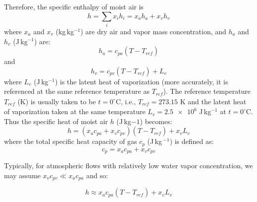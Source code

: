 Therefore, the specific enthalpy of moist air is 
\begin{equation}
h = \sum_i x_i h_i = x_a h_a + x_v h_v
\end{equation}
where $x_a$ and $x_v$ (kg\,kg$^{-1}$) are dry air and vapor mass concentration, and $h_a$ and $h_v$ (J\,kg$^{-1}$) are:
\begin{equation}
h_a = c_{pa} \left(T - T_{\textit{ref}}\right)
\end{equation}
and 
\begin{equation}
h_v = c_{pv} \left(  T - T_{\textit{ref}}\right) + L_v
\end{equation}
where $L_v$ (J\,kg$^{-1}$) is the latent heat of vaporization (more accurately, it is referenced at the same reference temperature as $T_{\textit{ref}}$). The reference temperature $T_{\textit{ref}}$ (K) is usually taken to be $t=0^{\circ}$C, i.e., $T_{\textit{ref}} = 273.15$ K and the latent heat of vaporization taken at the same temperature $L_v = \num{2.5e6}$ J\,kg$^{-1}$ at $t=0^{\circ}$C. Thus the specific heat of moist air $h$ (J\,kg${-1}$) becomes:
\begin{equation}
h = \left(x_a c_{pa} + x_v c_{pv} \right) \left(T - T_{\textit{ref}}\right)  + x_v L_v
\label{eq:enthalpymoistair}
\end{equation}
where the total specific heat capacity of gas $c_p$ (J\,kg\,$^{-1}$) is defined as:
\begin{equation}
c_p = x_a c_{pa} + x_v c_{pv}
\end{equation}

\begin{assumption}
Typically, for atmospheric flows with relatively low water vapor concentration, we may assume $x_v c_{pv} \ll x_a c_{pa}$ and so: 
\end{assumption}

\begin{equation}
h \approx x_a c_{pa} \left(T - T_{\textit{ref}}\right)  + x_v L_v
\end{equation}

